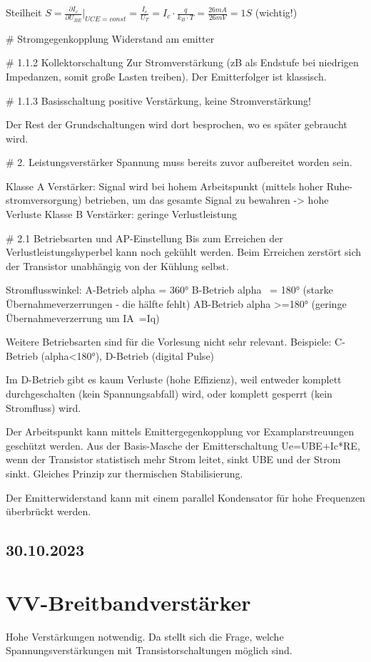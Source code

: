 \documentclass[a4paper]{article}
\begin{document}
Steilheit $S=\frac{\partial I_{c}}{\partial U_{BE}} |_{UCE=const} = \frac{I_{c}}{U_{T}}=I_{c}\cdot \frac{q}{k_{B}\cdot T}=\frac{26mA}{26mV}=1S$ (wichtig!)

# Stromgegenkopplung
Widerstand am emitter

# 1.1.2 Kollektorschaltung
Zur Stromverstärkung (zB als Endstufe bei niedrigen Impedanzen, somit große Lasten treiben).
Der Emitterfolger ist klassisch.

# 1.1.3 Basisschaltung
positive Verstärkung, keine Stromverstärkung!

Der Rest der Grundschaltungen wird dort besprochen, wo es später gebraucht wird.

# 2. Leistungsverstärker
Spannung muss bereits zuvor aufbereitet worden sein.

Klasse A Verstärker: Signal wird bei hohem Arbeitspunkt (mittels hoher Ruhe-
stromversorgung) betrieben, um das gesamte Signal zu bewahren -> hohe Verluste
Klasse B Verstärker: geringe Verlustleistung

# 2.1 Betriebsarten und AP-Einstellung
Bis zum Erreichen der Verlustleistungshyperbel kann noch gekühlt werden.
Beim Erreichen zerstört sich der Transistor unabhängig von der Kühlung selbst.

Stromflusswinkel:
    A-Betrieb alpha = 360°
    B-Betrieb alpha ~= 180° (starke Übernahmeverzerrungen - die hälfte fehlt)
    AB-Betrieb alpha >=180° (geringe Übernahmeverzerrung um IA~=Iq)

Weitere Betriebsarten sind für die Vorlesung nicht sehr relevant.
Beispiele: C-Betrieb (alpha<180°), D-Betrieb (digital Pulse)

Im D-Betrieb gibt es kaum Verluste (hohe Effizienz), weil entweder komplett
durchgeschalten (kein Spannungsabfall) wird, oder komplett gesperrt (kein
Stromfluss) wird.

Der Arbeitspunkt kann mittels Emittergegenkopplung vor Examplarstreuungen
geschützt werden.
Aus der Basis-Masche der Emitterschaltung Ue=UBE+Ic*RE, wenn der 
Transistor statistisch mehr Strom leitet, sinkt UBE und der Strom sinkt.
Gleiches Prinzip zur thermischen Stabilisierung.

Der Emitterwiderstand kann mit einem parallel Kondensator für hohe Frequenzen
überbrückt werden.

\subsection*{30.10.2023}
\section*{VV-Breitbandverstärker}
Hohe Verstärkungen notwendig. Da stellt sich die Frage, welche Spannungsverstärkungen mit Transistorschaltungen möglich sind.
\end{document}
